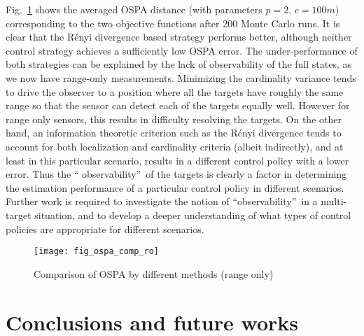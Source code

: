 \documentclass[twocolumn]{autart}
\begin{document}
Fig.~\ref{fig4} shows the averaged OSPA distance (with parameters $p=2$, $c=100m$) corresponding to the two objective functions after 200 Monte Carlo
runs. It is clear that the R\'{e}nyi divergence based strategy performs
better, although neither control strategy achieves a sufficiently low OSPA
error. The under-performance of both strategies can be explained by the lack
of observability of the full states, as we now have range-only measurements.
Minimizing the cardinality variance tends to drive the observer to a
position where all the targets have roughly the same range so that the
sensor can detect each of the targets equally well. However for range only
sensors, this results in difficulty resolving the targets. On the other
hand, an information theoretic criterion such as the R\'{e}nyi divergence tends to
account for both localization and cardinality criteria (albeit indirectly),
and at least in this particular scenario, results in a different control
policy with a lower error. Thus the \textquotedblleft
observability\textquotedblright\ of the targets is clearly a factor in
determining the estimation performance of a particular control policy in
different scenarios. Further work is required to investigate the notion of
\textquotedblleft observability\textquotedblright\ in a multi-target
situation, and to develop a deeper understanding of what types of control
policies are appropriate for different scenarios.
\begin{figure}[htb]
\centering
\texttt{[image: fig\_ospa\_comp\_ro]}
\caption{Comparison of OSPA by different methods (range
only) }
\label{fig4}
\end{figure}



\section{Conclusions and future works}
\end{document}
